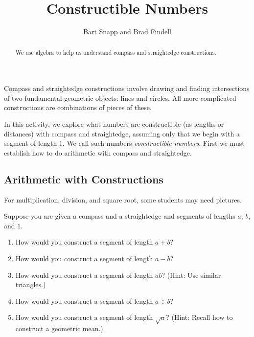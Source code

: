 \documentclass[nooutcomes,instructornotes]{ximera}
\title{Constructible Numbers}
\author{Bart Snapp and Brad Findell}
\begin{document}
\begin{abstract}
  We use algebra to help us understand compass and straightedge
  constructions.
\end{abstract}
\maketitle

Compass and straightedge constructions involve drawing and finding intersections of two fundamental geometric objects:  lines and circles.  All more complicated constructions are combinations of pieces of these.  

In this activity, we explore what numbers are constructible (as lengths or distances) with compass and straightedge, assuming only that we begin with a segment of length 1.  We call such numbers \textit{constructible numbers}.  First we must establish how to do arithmetic with compass and straightedge.  

\subsection*{Arithmetic with Constructions}
\begin{teachingnote}
For multiplication, division, and square root, some students may need pictures.  
\end{teachingnote}
\begin{problem}
Suppose you are given a compass and a straightedge and segments of lengths $a$, $b$, and $1$.  
\begin{enumerate}
\item How would you construct a segment of length $a+b$? 
\vfill
\item How would you construct a segment of length $a-b$? 
\vfill
\item How would you construct a segment of length $ab$?  (Hint:  Use similar triangles.)  
\vfill
\item How would you construct a segment of length $a\div b$? 
\vfill
\item How would you construct a segment of length $\sqrt{a}$?  (Hint: Recall how to construct a geometric mean.)  
\vfill
\end{enumerate}
\end{problem}
\end{document}
